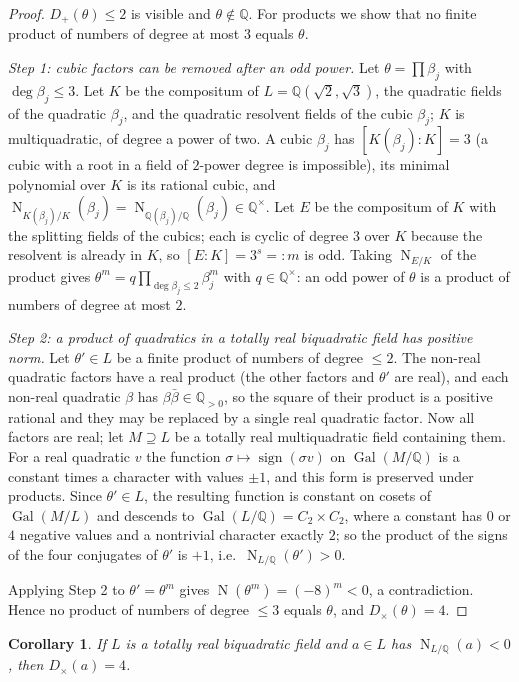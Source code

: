 \documentclass[11pt,a4paper]{article}
\newtheorem{corollary}[theorem]{Corollary}
\theoremstyle{definition}
\theoremstyle{remark}
\newcommand{\Q}{\mathbb{Q}}
\newcommand{\Gal}{\operatorname{Gal}}
\newcommand{\Nm}{\operatorname{N}}
\newcommand{\dg}{\deg}
\newcommand{\Dp}{D_{+}}
\newcommand{\Dt}{D_{\times}}
\begin{document}
\begin{proof}
$\Dp(\theta)\le2$ is visible and $\theta\notin\Q$.  For products we show that no finite product of
numbers of degree at most $3$ equals $\theta$.

\emph{Step 1: cubic factors can be removed after an odd power.}  Let $\theta=\prod\beta_j$ with
$\dg\beta_j\le3$.  Let $K$ be the compositum of $L=\Q(\sqrt2,\sqrt3)$, the quadratic fields of the
quadratic $\beta_j$, and the quadratic resolvent fields of the cubic $\beta_j$; $K$ is multiquadratic,
of degree a power of two.  A cubic $\beta_j$ has $[K(\beta_j):K]=3$ (a cubic with a root in a field of
$2$-power degree is impossible), its minimal polynomial over $K$ is its rational cubic, and
$\Nm_{K(\beta_j)/K}(\beta_j)=\Nm_{\Q(\beta_j)/\Q}(\beta_j)\in\Q^\times$.  Let $E$ be the compositum of
$K$ with the splitting fields of the cubics; each is cyclic of degree $3$ over $K$ because the
resolvent is already in $K$, so $[E:K]=3^s=:m$ is odd.  Taking $\Nm_{E/K}$ of the product gives
$\theta^m=q\prod_{\dg\beta_j\le2}\beta_j^m$ with $q\in\Q^\times$: an odd power of $\theta$ is a product
of numbers of degree at most $2$.

\emph{Step 2: a product of quadratics in a totally real biquadratic field has positive norm.}  Let
$\theta'\in L$ be a finite product of numbers of degree $\le2$.  The non-real quadratic factors have a
real product (the other factors and $\theta'$ are real), and each non-real quadratic $\beta$ has
$\beta\bar\beta\in\Q_{>0}$, so the square of their product is a positive rational and they may be
replaced by a single real quadratic factor.  Now all factors are real; let $M\supseteq L$ be a totally
real multiquadratic field containing them.  For a real quadratic $v$ the function
$\sigma\mapsto\operatorname{sign}(\sigma v)$ on $\Gal(M/\Q)$ is a constant times a character with values
$\pm1$, and this form is preserved under products.  Since $\theta'\in L$, the resulting function is
constant on cosets of $\Gal(M/L)$ and descends to $\Gal(L/\Q)=C_2\times C_2$, where a constant has
$0$ or $4$ negative values and a nontrivial character exactly $2$; so the product of the signs of the
four conjugates of $\theta'$ is $+1$, i.e.\ $\Nm_{L/\Q}(\theta')>0$.

Applying Step 2 to $\theta'=\theta^m$ gives $\Nm(\theta^m)=(-8)^m<0$, a contradiction.  Hence no
product of numbers of degree $\le3$ equals $\theta$, and $\Dt(\theta)=4$.
\end{proof}

\begin{corollary}\label{cor:negative-norm}
If $L$ is a totally real biquadratic field and $a\in L$ has $\Nm_{L/\Q}(a)<0$, then $\Dt(a)=4$.
\end{corollary}
\end{document}
